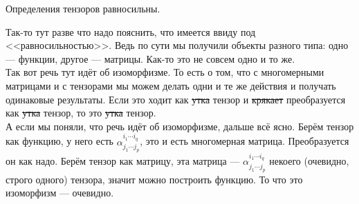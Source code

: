 \documentclass{article}
\begin{document}
\begin{itemize}
\begin{Proof}
        \end{Proof}
        \thm Определения тензоров равносильны.
        \begin{Comment}
            Так-то тут разве что надо пояснить, что имеется ввиду под <<равносильностью>>. Ведь по сути мы получили объекты разного типа: одно --- функции, другое --- матрицы. Как-то это не совсем одно и то же.\\
            Так вот речь тут идёт об изоморфизме. То есть о том, что с многомерными матрицами и с тензорами мы можем делать одни и те же действия и получать одинаковые результаты. Если это ходит как \sout{утка} тензор и \sout{крякает} преобразуется как \sout{утка} тензор, то это \sout{утка} тензор.\\
            А если мы поняли, что речь идёт об изоморфизме, дальше всё ясно. Берём тензор как функцию, у него есть $\alpha^{i_1\cdots i_q}_{j_1\cdots j_p}$, это и есть многомерная матрица. Преобразуется он как надо. Берём тензор как матрицу, эта матрица --- $\alpha^{i_1\cdots i_q}_{j_1\cdots j_p}$ некоего (очевидно, строго одного) тензора, значит можно построить функцию. То что это изоморфизм --- очевидно.
        \end{Comment}
    \end{itemize}
\end{document}
